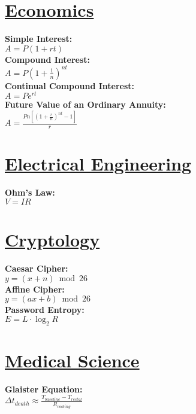 \documentclass[12pt]{article}
\begin{document}
\section*{\underline{Economics}}
\textbf{Simple Interest:}
    \\ \( A = P( 1 + rt ) \)
\\ \textbf{Compound Interest:}
    \\ \( A = P( 1 + \displaystyle\frac{ 1 }{ n } )^{nt} \)
\\ \textbf{Continual Compound Interest:}
    \\ \( A = P e^{rt} \)
\\ \textbf{Future Value of an Ordinary Annuity:}
    \\ \( A = \displaystyle\frac{ Pn \left[ \left( 1 + \frac{ r }{ n } \right)^{nt} - 1 \right] }{ r } \)



\section*{\underline{Electrical Engineering}}
\textbf{Ohm's Law:}
    \\ \( V = IR \)



\section*{\underline{Cryptology}}
\textbf{Caesar Cipher:}
    \\ \( y = ( x + n ) \bmod 26 \)
\\ \textbf{Affine Cipher:}
    \\ \( y = ( ax + b ) \bmod 26 \)
\\ \textbf{Password Entropy:}
    \\ \( E = L \cdot \log_2{ R } \)



\section*{\underline{Medical Science}}
\textbf{Glaister Equation:}
    \\ \( \Delta t_{death} \approx \displaystyle\frac{ T_{baseline} - T_{rectal} }{ R_{cooling} } \)
\end{document}
